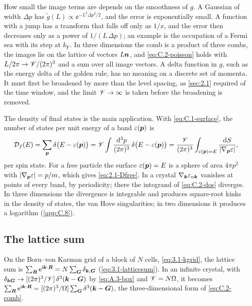 How small the image terms are depends on the smoothness of $g$. A Gaussian of width $\Delta p$ has $\tilde g(L) \propto \ee^{-L^2\Delta p^2/2}$, and the error is exponentially small. A function with a jump has a transform that falls off only as $1/x$, and the error then decreases only as a power of $1/(L\,\Delta p)$; an example is the occupation of a Fermi sea with its step at $k_{\mathrm{F}}$. In three dimensions the comb is a product of three combs, the images lie on the lattice of vectors $L\bm{n}$, and \cref{eq:C.2-poisson} holds with $L/2\pi \to \mathscr{V}/(2\pi)^3$ and a sum over all image vectors. A delta function in $g$, such as the energy delta of the golden rule, has no meaning on a discrete set of momenta. It must first be broadened by more than the level spacing, as \cref{sec:2.1} required of the time window, and the limit $\mathscr{V}\to\infty$ is taken before the broadening is removed.

The density of final states is the main application. With \cref{eq:C.1-surface}, the number of states per unit energy of a band $\varepsilon(\bm{p})$ is
\begin{equation}
  \mathcal{D}_f(E) = \sum_{\bm{p}}\delta\bigl(E - \varepsilon(\bm{p})\bigr) = \mathscr{V}\int\frac{\mathrm{d}^3p}{(2\pi)^3}\,\delta\bigl(E - \varepsilon(\bm{p})\bigr) = \frac{\mathscr{V}}{(2\pi)^3}\int_{\varepsilon(\bm{p}) = E}\frac{\mathrm{d} S}{|\nabla_{\bm{p}}\varepsilon|} ,
  \label{eq:C.2-dos}
\end{equation}
per spin state. For a free particle the surface $\varepsilon(\bm{p}) = E$ is a sphere of area $4\pi p^2$ with $|\nabla_{\bm{p}}\varepsilon| = p/m$, which gives \cref{eq:2.1-Dfree}. In a crystal $\nabla_{\bm{k}}\varepsilon_{n\bm{k}}$ vanishes at points of every band, by periodicity; there the integrand of \cref{eq:C.2-dos} diverges. In three dimensions the divergence is integrable and produces square-root kinks in the density of states, the van Hove singularities; in two dimensions it produces a logarithm (\cref{app:C.8}).

\subsection{The lattice sum}

On the Born--von Karman grid of a block of $N$ cells, \cref{eq:3.1-kgrid}, the lattice sum is $\sum_{\bm{R}}\mathrm{e}^{\mathrm{i}\bm{k}\cdot\bm{R}} = N\sum_{\bm{G}}\delta_{\bm{k},\bm{G}}$ (\cref{eq:3.1-latticesum}). In an infinite crystal, with $\delta_{\bm{k}\bm{G}} \to [(2\pi)^3/\mathscr{V}]\,\delta^3(\bm{k} - \bm{G})$ by \cref{eq:A.3-box} and $\mathscr{V} = N\Omega$, it becomes $\sum_{\bm{R}}\mathrm{e}^{\mathrm{i}\bm{k}\cdot\bm{R}} = [(2\pi)^3/\Omega]\sum_{\bm{G}}\delta^3(\bm{k} - \bm{G})$, the three-dimensional form of \cref{eq:C.2-comb}.

